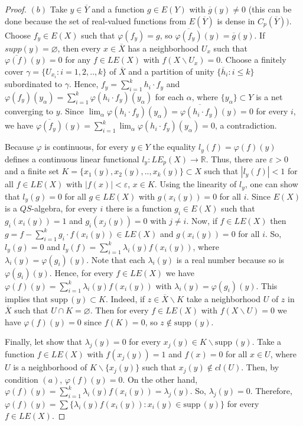 \documentclass[12pt]{amsart}
\def\supp{{\mathrm {supp}}\,}
\begin{document}
\begin{proof}
$(b)$ Take $y\in\overline Y$ and a function $g\in E(Y)$ with $\overline g(y)\neq 0$ (this can be done
because the set of real-valued functions from $E(\overline Y)$ is dense in $C_p(\overline Y))$.
Choose $f_y\in E(X)$ such that $\varphi(f_y)=g$, so $\overline{\varphi(f_y)}(y)=\overline g(y)$. If $supp(y)=\varnothing$, then every $x\in\overline X$ has a neighborhood $U_x$ such that $\overline{\varphi(f)}(y)=0$ for any $f\in LE(X)$ with $f(X\backslash U_x)=0$. Choose a finitely cover 
$\gamma=\{U_{x_i}:i=1,2,..,k\}$ of $\overline X$ and a partition of unity $\{\overline h_i:i\leq k\}$ subordinated to $\gamma$. Hence, $f_y=\sum_{i=1}^kh_i\cdot f_y$ and $\varphi(f_y)(y_\alpha)=\sum_{i=1}^k\varphi(h_i\cdot f_y)(y_\alpha)$ for each $\alpha$, where  $\{y_\alpha\}\subset Y$ is a net converging to $y$.
Since $\lim_\alpha\varphi(h_i\cdot f_y)(y_\alpha)=\overline{\varphi(h_i\cdot f_y)}(y)=0$ for every $i$, we have 
$\overline{\varphi(f_y)}(y)=\sum_{i=1}^k\lim_\alpha\varphi(h_i\cdot f_y)(y_\alpha)=0$, a contradiction.

Because $\varphi$ is continuous, for every
$y\in Y$ the equality $l_y(f)=\varphi(f)(y)$ defines a continuous linear functional $l_y:LE_p(X)\to\mathbb R$. Thus, there are $\varepsilon >0$ and a finite set $K=\{x_1(y),x_2(y),..,x_k(y)\}\subset X$ such that $|l_y(f)|<1$ for all $f\in LE(X)$ with $|f(x)|<\varepsilon$, $x\in K$.
Using the linearity of $l_y$, one can show that $l_y(g)=0$ for all $g\in LE(X)$ with $g(x_i(y))=0$ for all $i$. 
Since $E(X)$ is a $QS$-algebra, for every $i$ there is a function $g_i\in E(X)$ such that $g_i(x_i(y))=1$ and $g_i(x_j(y))=0$ with $j\neq i$. Now, if 
$f\in LE(X)$ then 
$g=f-\sum_{i=1}^kg_i\cdot f(x_i(y))\in LE(X)$ and $g(x_i(y))=0$ for all $i$. So, $l_y(g)=0$ and 
$l_y(f)=\sum_{i=1}^k\lambda_i(y)f(x_i(y))$, where $\lambda_i(y)=\varphi(g_i)(y)$. 
Note that each $\lambda_i(y)$ is a real number because so is $\varphi(g_i)(y)$. Hence, for every $f\in LE(X)$ we have $\varphi(f)(y)=\sum_{i=1}^k\lambda_i(y)f(x_i(y))$ with $\lambda_i(y)=\varphi(g_i)(y)$. This implies that $\supp(y)\subset K$. Indeed, if $z\in\overline X\backslash K$ take a neighborhood $U$ of $z$ in $\overline X$ such that $U\cap K=\varnothing$. Then for every $f\in LE(X)$ with $f(X\backslash U)=0$ we have 
$\varphi(f)(y)=0$ since $f(K)=0$, so $z\not\in\supp(y)$.

Finally, let show that $\lambda_j(y)=0$ for every $x_j(y)\in K\backslash\supp(y)$. Take a function $f\in LE(X)$ with $f(x_j(y))=1$ and $f(x)=0$ for all $x\in U$, where $U$ is a neighborhood of $K\backslash\{x_j(y)\}$ such that $x_j(y)\not\in cl(U)$. Then, by condition $(a)$, $\varphi(f)(y)=0$. On the other hand,
$\varphi(f)(y)=\sum_{i=1}^k\lambda_i(y)f(x_i(y))=\lambda_j(y)$. So, $\lambda_j(y)=0$. Therefore, $\varphi(f)(y)=\sum\{\lambda_i(y)f(x_i(y)):x_i(y)\in\supp(y)\}$ for every $f\in LE(X)$.


\end{proof}
\end{document}

